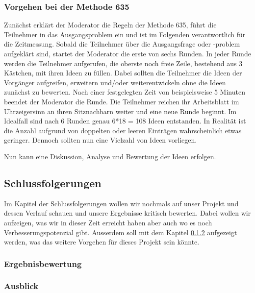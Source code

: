 \subsubsection*{Vorgehen bei der Methode 635}
Zunächst erklärt der Moderator die Regeln der Methode 635, führt die Teilnehmer in das Ausgangsproblem ein und ist im Folgenden verantwortlich für die Zeitmessung. Sobald die Teilnehmer über die Ausgangsfrage oder -problem aufgeklärt sind, startet der Moderator die erste von sechs Runden. In jeder Runde werden die Teilnehmer aufgerufen, die oberste noch freie Zeile, bestehend aus 3 Kästchen, mit ihren Ideen zu füllen. Dabei sollten die Teilnehmer die Ideen der Vorgänger aufgreifen, erweitern und/oder weiterentwickeln ohne die Ideen zunächst zu bewerten. Nach einer festgelegten Zeit von beispielsweise 5 Minuten beendet der Moderator die Runde. Die Teilnehmer reichen ihr Arbeitsblatt im Uhrzeigersinn an ihren Sitznachbarn weiter und eine neue Runde beginnt. Im Idealfall sind nach 6 Runden genau 6*18 = 108 Ideen entstanden. In Realität ist die Anzahl aufgrund von doppelten oder leeren Einträgen wahrscheinlich etwas geringer. Dennoch sollten nun eine Vielzahl von Ideen vorliegen.


Nun kann eine Diskussion, Analyse und Bewertung der Ideen erfolgen.

\newpage


\newpage


\newpage


\newpage


\newpage


\newpage


\newpage


\newpage


\subsection{Schlussfolgerungen}
Im Kapitel der Schlussfolgerungen wollen wir nochmals auf unser Projekt und dessen Verlauf schauen und unsere Ergebnisse kritisch bewerten. Dabei wollen wir aufzeigen, was wir in dieser Zeit erreicht haben aber auch wo es noch Verbesserungspotenzial gibt. Ausserdem soll mit dem Kapitel \ref{subsub:Ausblick} aufgezeigt werden, was das weitere Vorgehen für dieses Projekt sein könnte.

\subsubsection{Ergebnisbewertung}

\subsubsection{Ausblick}
\label{subsub:Ausblick}



